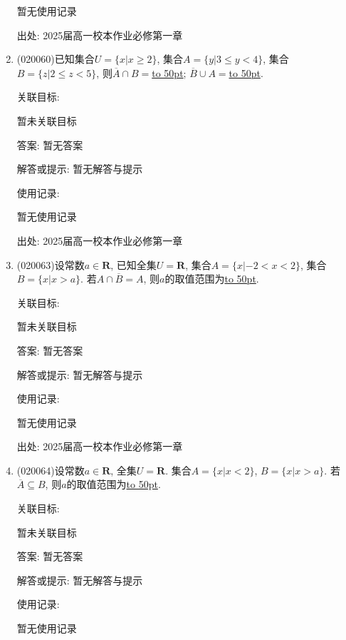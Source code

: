 \documentclass[10pt,a4paper]{article}
\newcommand{\blank}[1]{\underline{\hbox to #1pt{}}}
\begin{document}
\begin{enumerate}[1.]
暂无使用记录


出处: 2025届高一校本作业必修第一章
\item { (020060)}已知集合$U=\{x|x\ge 2\}$, 集合$A=\{y|3\le y<4\}$, 集合$B=\{z|2\le z<5\}$, 则$\overline A\cap B=$\blank{50}; $\overline B\cup A=$\blank{50}.


关联目标:

暂未关联目标

答案: 暂无答案

解答或提示: 暂无解答与提示

使用记录:

暂无使用记录


出处: 2025届高一校本作业必修第一章
\item { (020063)}设常数$a\in \mathbf{R}$, 已知全集$U=\mathbf{R}$, 集合$A=\{x|-2<x<2\}$, 集合$B=\{x|x>a\}$. 若$A\cap\overline B=A$, 则$a$的取值范围为\blank{50}.


关联目标:

暂未关联目标

答案: 暂无答案

解答或提示: 暂无解答与提示

使用记录:

暂无使用记录


出处: 2025届高一校本作业必修第一章
\item { (020064)}设常数$a\in \mathbf{R}$, 全集$U=\mathbf{R}$. 集合$A=\{x| x<2 \}$, $B=\{x| x>a \}$. 若$\overline A\subseteq B$, 则$a$的取值范围为\blank{50}.


关联目标:

暂未关联目标

答案: 暂无答案

解答或提示: 暂无解答与提示

使用记录:

暂无使用记录



\end{enumerate}
\end{document}
